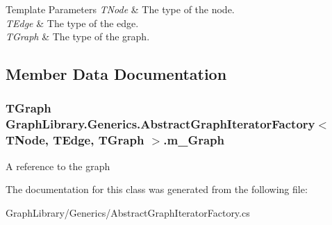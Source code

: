 \begin{DoxyTemplParams}{Template Parameters}
{\em T\+Node} & The type of the node.\\
\hline
{\em T\+Edge} & The type of the edge.\\
\hline
{\em T\+Graph} & The type of the graph.\\
\hline
\end{DoxyTemplParams}


\subsection{Member Data Documentation}
\hypertarget{class_graph_library_1_1_generics_1_1_abstract_graph_iterator_factory_a536c2a6608e8d664bc37c0ee9b878d91}{}
\subsubsection[{m\+\_\+\+Graph}]{\setlength{\rightskip}{0pt plus 5cm}T\+Graph {\bf Graph\+Library.\+Generics.\+Abstract\+Graph\+Iterator\+Factory}$<$ T\+Node, T\+Edge, T\+Graph $>$.m\+\_\+\+Graph\hspace{0.3cm}{\ttfamily [protected]}}\label{class_graph_library_1_1_generics_1_1_abstract_graph_iterator_factory_a536c2a6608e8d664bc37c0ee9b878d91}


A reference to the graph 



The documentation for this class was generated from the following file\+:\begin{DoxyCompactItemize}
\item 
Graph\+Library/\+Generics/Abstract\+Graph\+Iterator\+Factory.\+cs\end{DoxyCompactItemize}
